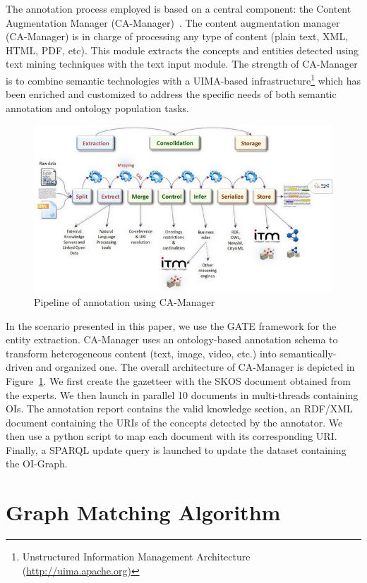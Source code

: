 \documentclass[runningheads,a4paper]{{llncs}}
\begin{document}
The annotation process employed is based on a central component: the Content Augmentation Manager (CA-Manager)~\cite{cam2013}. The content augmentation manager (CA-Manager) is in charge of processing any type of content (plain text, XML, HTML, PDF, etc). This module extracts the concepts and entities detected using text mining techniques with the text input module. The strength of CA-Manager is to combine semantic technologies with a UIMA-based infrastructure\footnote{Unstructured Information Management Architecture (\url{http://uima.apache.org)}} which has been enriched and customized to address the specific needs of both semantic annotation and ontology population tasks.

\begin{figure}[!htb]
\centering
\includegraphics[scale=0.6]{img/cam_fig1.png}
\caption{Pipeline of annotation using CA-Manager}
\label{figcam}
\end{figure}


In the scenario presented in this paper, we use the GATE framework for the entity extraction. CA-Manager uses an ontology-based annotation schema to transform heterogeneous content (text, image, video, etc.) into semantically-driven and organized one. The overall architecture of CA-Manager is depicted in Figure~\ref{figcam}. 
We first create the gazetteer with the SKOS document obtained from the experts. We then launch in parallel 10  documents in multi-threads containing OIs. The annotation report contains the valid knowledge section, an RDF/XML document containing the URIs of the concepts detected by the annotator. We then use a python script to map each document with its corresponding URI. Finally, a SPARQL update query is launched to update the dataset containing the OI-Graph.   



\section{Graph Matching Algorithm}
\label{sec:matching}
\end{document}
